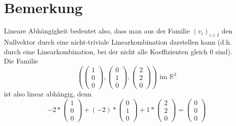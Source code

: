 \documentclass{scrbook}
\begin{document}
\section{Bemerkung}
Lineare Abhängigkeit bedeutet also, dass man aus der Familie \((v_i)_{i\in I}\) den Nullvektor durch eine nicht-triviale Linearkombination darstellen kann (d.h. durch eine Linearkombination, bei der nicht alle Koeffizienten gleich 0 sind).\\
Die Familie
\[
\left(
\left(
\begin{array}{c}
1\\0\\0
\end{array}
\right),
\left(
\begin{array}{c}
0\\1\\0
\end{array}
\right),
\left(
\begin{array}{c}
2\\2\\0
\end{array}
\right)
\right) \text{ im } \mathbb{R}^3
\]
ist also linear abhängig, denn 
\[-2*
\left(
\begin{array}{c}
1\\0\\0
\end{array}\right)
+(-2)*
\left(
\begin{array}{c}
0\\1\\0
\end{array}
\right)+1*
\left(
\begin{array}{c}
2\\2\\0
\end{array}
\right)
=\left(
\begin{array}{c}
0\\0\\0
\end{array}
\right)
\]
\end{document}
